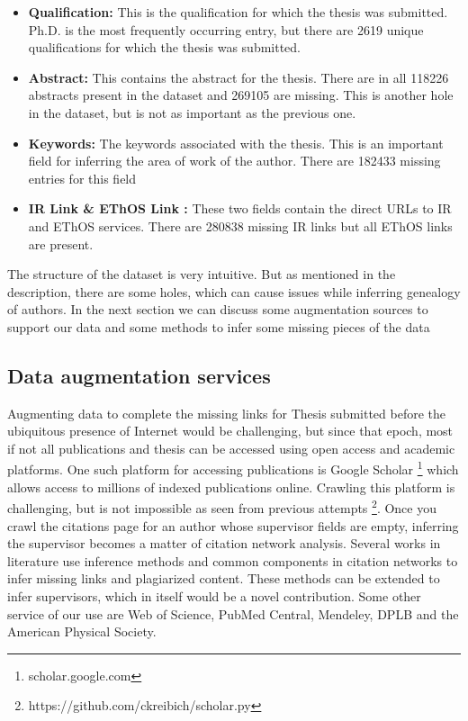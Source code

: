 \documentclass[a4paper]{article}
\begin{document}
\begin{itemize}
\item \textbf{Qualification:} This is the qualification for which the thesis was submitted. Ph.D. is the most frequently occurring entry, but there are 2619 unique qualifications for which the thesis was submitted. 
\item \textbf{Abstract:} This contains the abstract for the thesis. There are in all 118226 abstracts present in the dataset and 269105 are missing. This is another hole in the dataset, but is not as important as the previous one.
\item \textbf{Keywords:} The keywords associated with the thesis. This is an important field for inferring the area of work of the author. There are 182433 missing entries for this field
\item \textbf{IR Link \& EThOS Link : } These two fields contain the direct URLs to IR and EThOS services. There are 280838 missing IR links but all EThOS links are present.
\end{itemize}

The structure of the dataset is very intuitive. But as mentioned in the description, there are some holes, which can cause issues while inferring genealogy of authors. In the next section we can discuss some augmentation sources to support our data and some methods to infer some missing pieces of the data




\subsection{Data augmentation services}
\label{DataAug}
Augmenting data to complete the missing links for Thesis submitted before the ubiquitous presence of Internet would be challenging, but since that epoch, most if not all publications and thesis can be accessed using open access and academic platforms. One such platform for accessing publications is Google Scholar \footnote{scholar.google.com} which allows access to millions of indexed publications online. Crawling this platform is challenging, but is not impossible as seen from previous attempts \footnote{https://github.com/ckreibich/scholar.py}. Once you crawl the citations page for an author whose supervisor fields are empty, inferring the supervisor becomes a matter of citation network analysis. Several works in literature \cite{ciotti2016homophily,Gipp:2011:CET:1998076.1998124} use inference methods and common components in citation networks to infer missing links and plagiarized content. These methods can be extended to infer supervisors, which in itself would be a novel contribution.
Some other service of our use are Web of Science, PubMed Central, Mendeley, DPLB and the American Physical Society.
\end{document}
